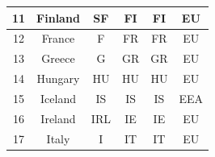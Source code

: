 \begin{table}[!ht]
\begin{tabular}{|c|c|c|c|c|c|}
11           & Finland                                                                & SF                                                              & FI                                                          & FI                                                                & EU                                                                 \\ \hline
12           & France                                                                 & F                                                               & FR                                                          & FR                                                                & EU                                                                 \\ \hline
13           & Greece                                                                 & G                                                               & GR                                                          & GR                                                                & EU                                                                 \\ \hline
14           & Hungary                                                                & HU                                                              & HU                                                          & HU                                                                & EU                                                                 \\ \hline
15           & Iceland                                                                & IS                                                              & IS                                                          & IS                                                                & EEA                                                                \\ \hline
16           & Ireland                                                                & IRL                                                             & IE                                                          & IE                                                                & EU                                                                 \\ \hline
17           & Italy                                                                  & I                                                               & IT                                                          & IT                                                                & EU                                                                 \\ \hline

\end{tabular}
\end{table}
